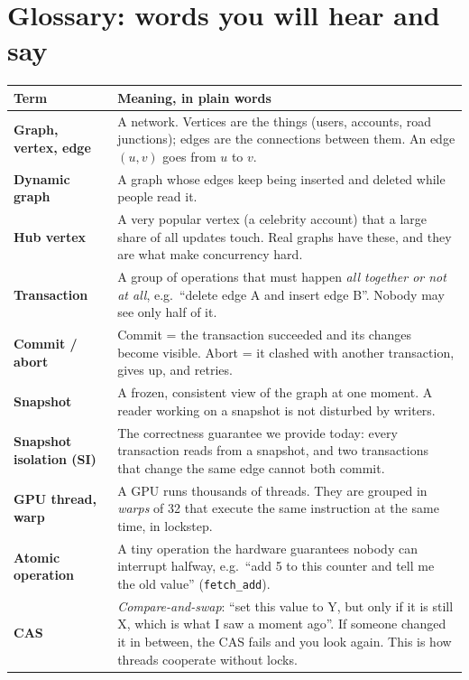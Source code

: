 \documentclass[11pt,a4paper]{article}
\newcommand{\code}[1]{\texttt{#1}}
\begin{document}
\section{Glossary: words you will hear and say}
\label{sec:glossary}

\begin{center}
\renewcommand{\arraystretch}{1.25}
\begin{tabular}{@{}>{\raggedright\arraybackslash\bfseries}p{3.1cm}>{\raggedright\arraybackslash}p{12.2cm}@{}}
\toprule
Term & Meaning, in plain words \\
\midrule
Graph, vertex, edge & A network. Vertices are the things (users, accounts, road junctions); edges are the connections
  between them. An edge $(u,v)$ goes from $u$ to $v$. \\
Dynamic graph & A graph whose edges keep being inserted and deleted while people read it. \\
Hub vertex & A very popular vertex (a celebrity account) that a large share of all updates touch. Real graphs have
  these, and they are what make concurrency hard. \\
Transaction & A group of operations that must happen \emph{all together or not at all}, e.g.\ ``delete edge A and insert
  edge B''. Nobody may see only half of it. \\
Commit / abort & Commit = the transaction succeeded and its changes become visible. Abort = it clashed with another
  transaction, gives up, and retries. \\
Snapshot & A frozen, consistent view of the graph at one moment. A reader working on a snapshot is not disturbed by
  writers. \\
Snapshot isolation (SI) & The correctness guarantee we provide today: every transaction reads from a snapshot, and two
  transactions that change the same edge cannot both commit. \\
GPU thread, warp & A GPU runs thousands of threads. They are grouped in \emph{warps} of 32 that execute the same
  instruction at the same time, in lockstep. \\
Atomic operation & A tiny operation the hardware guarantees nobody can interrupt halfway, e.g.\ ``add 5 to this
  counter and tell me the old value'' (\code{fetch\_add}). \\
CAS & \emph{Compare-and-swap}: ``set this value to Y, but only if it is still X, which is what I saw a moment ago''. If
  someone changed it in between, the CAS fails and you look again. This is how threads cooperate without locks. \\

\end{tabular}
\end{center}
\end{document}
